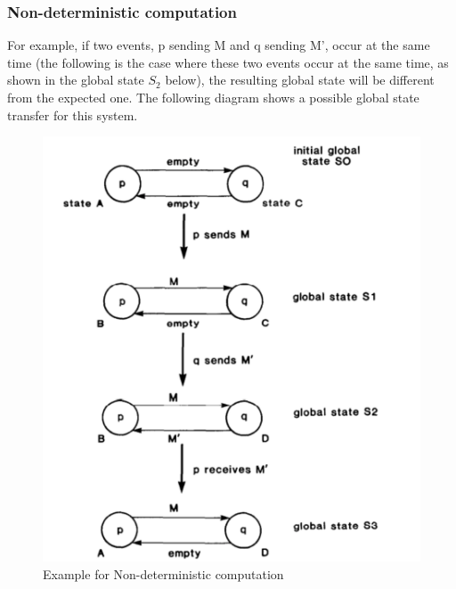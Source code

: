 \documentclass[acmlarge]{acmart}
\begin{document}
\subsubsection{Non-deterministic computation}
For example, if two events, p sending M and q sending M', occur at the same time (the following is the case where these two events occur at the same time, as shown in the global state $S_2$ below), the resulting global state will be different from the expected one. The following diagram shows a possible global state transfer for this system.
\begin{figure}[h]
  \centering
  \includegraphics[width=0.4\linewidth]{./non-deterministic-comutation.png}
  \caption{Example for Non-deterministic computation}
\end{figure}
\end{document}
